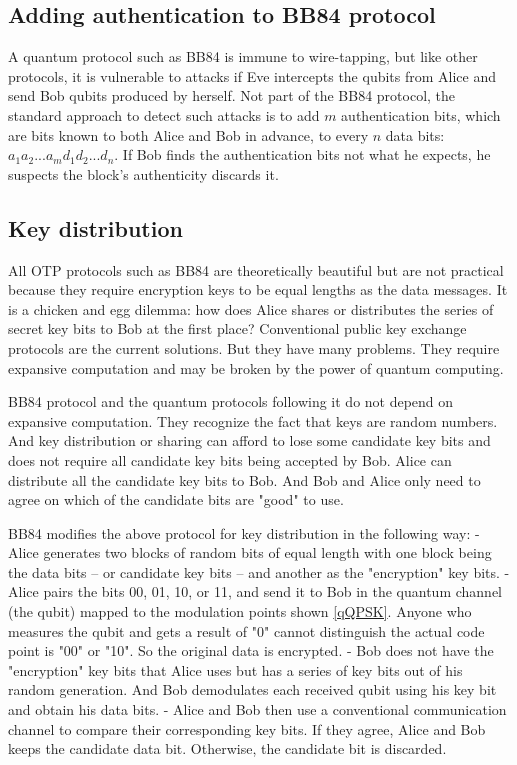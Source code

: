 \documentclass[Letter,11pt]{book}
\begin{document}
\subsection{Adding authentication to BB84 protocol}
A quantum protocol such as BB84 is immune to wire-tapping, but like other protocols, it is vulnerable to attacks if Eve intercepts the qubits from Alice and send Bob qubits produced by herself. Not part of the BB84 protocol, the standard approach to detect such attacks is to add $m$ authentication bits, which are bits known to both Alice and Bob in advance, to every $n$ data bits:$a_1 a_2 ... a_m d_1 d_2 ...d_n$. If Bob finds the authentication bits not what he expects, he suspects the block's authenticity discards it.

\subsection{Key distribution}
All OTP protocols such as BB84 are theoretically beautiful but are not practical because they require encryption keys to be equal lengths as the data messages. It is a chicken and egg dilemma: how does Alice shares or distributes the series of secret key bits to Bob at the first place? Conventional public key exchange protocols are the current solutions. But they have many problems. They require expansive computation and may be broken by the power of quantum computing.

BB84 protocol and the quantum protocols following it do not depend on expansive computation. They recognize the fact that keys are random numbers. And key distribution or sharing can afford to lose some candidate key bits and does not require all candidate key bits being accepted by Bob. Alice can distribute all the candidate key bits to Bob. And Bob and Alice only need to agree on which of the candidate bits are "good" to use.

BB84 modifies the above protocol for key distribution in the following way:
- Alice generates two blocks of random bits of equal length with one block being the data bits -- or candidate key bits -- and another as the "encryption" key bits.
- Alice pairs the bits 00, 01, 10, or 11, and send it to Bob in the quantum channel (the qubit) mapped to the modulation points shown \ref{qQPSK}. Anyone who measures the qubit and gets a result of "0" cannot distinguish the actual code point is "00" or "10". So the original data is encrypted.
- Bob does not have the "encryption" key bits that Alice uses but has a series of key bits out of his random generation. And Bob demodulates each received qubit using his key bit and obtain his data bits.
- Alice and Bob then use a conventional communication channel to compare their corresponding key bits. If they agree, Alice and Bob keeps the candidate data bit. Otherwise, the candidate bit is discarded.
\end{document}
